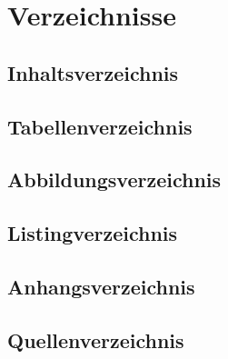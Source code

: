 \section{Verzeichnisse}
\subsection{Inhaltsverzeichnis}
\subsection{Tabellenverzeichnis}
\subsection{Abbildungsverzeichnis}
\subsection{Listingverzeichnis}
\subsection{Anhangsverzeichnis}
\subsection{Quellenverzeichnis}